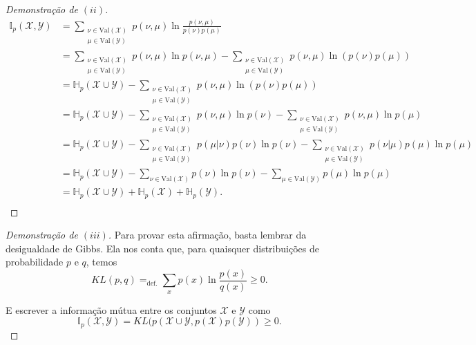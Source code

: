 \documentclass[paper=a4, fontsize=11pt]{scrartcl} %
\numberwithin{equation}{subsection}
\numberwithin{figure}{subsection}
\numberwithin{table}{subsection}
\numberwithin{definition}{subsection}
\numberwithin{theorem}{subsection}
\numberwithin{property}{subsection}
\numberwithin{proposition}{subsection}
\numberwithin{equation}{section}
\numberwithin{figure}{section}
\numberwithin{table}{section}
\numberwithin{definition}{section}
\numberwithin{theorem}{section}
\numberwithin{property}{section}
\numberwithin{proposition}{section}
\newcommand{\set}[1]{\mathcal{#1}}
\newcommand{\infp}{\ensuremath{\mathbb{I}_p}\xspace}
\newcommand{\entp}{\ensuremath{\mathbb{H}_p}\xspace}
\newcommand{\val}{\ensuremath{\text{Val}}\xspace}
\newcommand{\Y}{\ensuremath{\set{Y}}\xspace}
\newcommand{\X}{\ensuremath{\set{X}}\xspace}
\begin{document}
\begin{proof}[Demonstração de $(ii)$]

\begin{align*}
\infp(\set{X}, \set{Y})
  &= \sum_{\substack{\nu \in \val(\set{X}) \\ \mu \in \val(\set{Y})}} p(\nu, \mu) \ln \frac{p(\nu, \mu)}{p(\nu)p(\mu)} \\
  &= \sum_{\substack{\nu \in \val(\set{X}) \\ \mu \in \val(\set{Y})}} p(\nu, \mu) \ln p(\nu, \mu) - \sum_{\substack{\nu \in \val(\set{X}) \\ \mu \in \val(\set{Y})}} p(\nu, \mu) \ln \left( p(\nu)p(\mu) \right) \\
  &= \entp(\X \cup \Y) - \sum_{\substack{\nu \in \val(\set{X}) \\ \mu \in \val(\set{Y})}} p(\nu, \mu) \ln \left( p(\nu)p(\mu) \right) \\
  &= \entp(\X \cup \Y) - \sum_{\substack{\nu \in \val(\set{X}) \\ \mu \in \val(\set{Y})}} p(\nu, \mu) \ln p(\nu) - \sum_{\substack{\nu \in \val(\set{X}) \\ \mu \in \val(\set{Y})}} p(\nu, \mu) \ln p(\mu)  \\
  &= \entp(\X \cup \Y) - \sum_{\substack{\nu \in \val(\set{X}) \\ \mu \in \val(\set{Y})}} p(\mu | \nu) p(\nu) \ln p(\nu) - \sum_{\substack{\nu \in \val(\set{X}) \\ \mu \in \val(\set{Y})}} p(\nu | \mu ) p(\mu)  \ln p(\mu)  \\
  &= \entp(\X \cup \Y) - \sum_{\nu \in \val(\set{X})} p(\nu) \ln p(\nu) - \sum_{\mu \in \val(\set{Y})} p(\mu)  \ln p(\mu)  \\
  &= \entp(\X \cup \Y) + \entp(\X) + \entp(\Y). \\
\end{align*}

\end{proof}

\begin{proof}[Demonstração de $(iii)$]

Para provar esta afirmação, basta lembrar da desigualdade de Gibbs. Ela nos conta que, para quaisquer distribuições
de probabilidade $p$ e $q$, temos
$$
KL(p, q) =_{\text{def.}} \sum_{x} p(x) \ln \frac{p(x)}{q(x)} \geq 0.
$$

E escrever a informação mútua entre os conjuntos \X e \Y como
$$
\infp(\set{X}, \set{Y}) = KL(p(\X \cup \Y, p(\X)p(\Y)) \geq 0.
$$


\end{proof}
\end{document}
